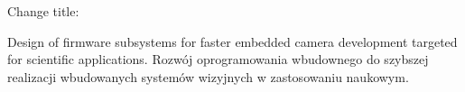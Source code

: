 Change title:

Design of firmware subsystems for faster embedded camera development targeted for scientific applications. 
Rozwój oprogramowania wbudownego do szybszej realizacji wbudowanych systemów wizyjnych w zastosowaniu naukowym. 


